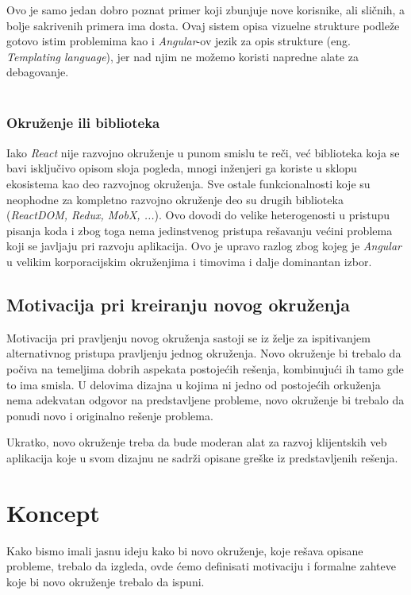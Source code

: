 \documentclass[12pt,oneside]{memoir}
\begin{document}
Ovo je samo jedan dobro poznat primer koji zbunjuje nove korisnike, ali sličnih, a bolje sakrivenih primera ima dosta.
Ovaj sistem opisa vizuelne strukture podleže gotovo istim problemima kao i \emph{Angular}-ov jezik za opis strukture (eng. \emph{Templating language}),
jer nad njim ne možemo koristi napredne alate za debagovanje.
\\
\\

\subsection{Okruženje ili biblioteka}
Iako \emph{React} nije razvojno okruženje u punom smislu te reči, već biblioteka koja se bavi isključivo opisom sloja pogleda,
mnogi inženjeri ga koriste u sklopu ekosistema kao deo razvojnog okruženja.
Sve ostale funkcionalnosti koje su neophodne za kompletno razvojno okruženje deo su drugih biblioteka (\emph{ReactDOM, Redux, MobX, ...}).
Ovo dovodi do velike heterogenosti u pristupu pisanja koda i zbog toga nema jedinstvenog pristupa rešavanju većini problema
koji se javljaju pri razvoju aplikacija. Ovo je upravo razlog zbog kojeg je \emph{Angular} u velikim korporacijskim okruženjima i timovima
i dalje dominantan izbor.

\section{Motivacija pri kreiranju novog okruženja}
Motivacija pri pravljenju novog okruženja sastoji se iz želje za ispitivanjem
alternativnog pristupa pravljenju jednog okruženja. Novo okruženje bi trebalo
da počiva na temeljima dobrih aspekata postojećih rešenja, kombinujući ih tamo
gde to ima smisla. U delovima dizajna u kojima ni jedno od postojećih orkuženja
nema adekvatan odgovor na predstavljene probleme, novo okruženje bi trebalo
da ponudi novo i originalno rešenje problema.

Ukratko, novo okruženje treba da bude moderan alat za razvoj klijentskih
veb aplikacija koje u svom dizajnu ne sadrži opisane greške iz predstavljenih rešenja.

\chapter{Koncept}\label{chap:koncept}
Kako bismo imali jasnu ideju kako bi novo okruženje, koje rešava opisane probleme,
trebalo da izgleda, ovde ćemo definisati motivaciju i formalne zahteve koje bi novo
okruženje trebalo da ispuni.  
\end{document}
